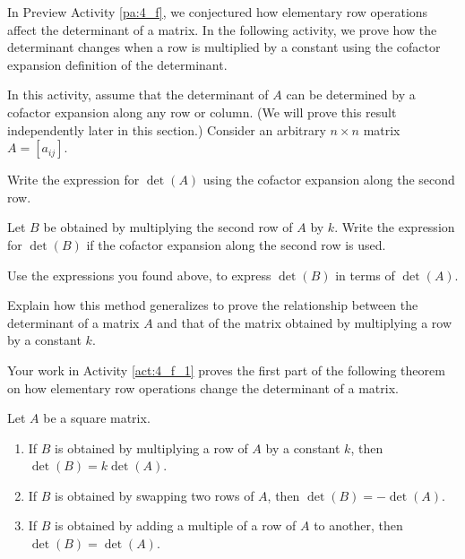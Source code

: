 
In Preview Activity \ref{pa:4_f}, we conjectured how elementary row operations affect the determinant of a matrix. In the following activity, we prove how the determinant changes when a row is multiplied by a constant using the cofactor expansion definition of the determinant.


\begin{activity} \label{act:4_f_1} In this activity, assume that the determinant of $A$ can be determined by a cofactor expansion along any row or column. (We will prove this result independently later in this section.) Consider an arbitrary $n \times n$ matrix $A = [a_{ij}]$. 
	\ba
	\item  

		\item Write the expression for $\det(A)$ using the cofactor expansion along the second row.


	
		\item Let $B$ be obtained by multiplying the second row of $A$ by $k$. Write the expression for $\det(B)$ if the cofactor expansion along the second row is used.



		\item Use the expressions you found above, to express $\det(B)$ in terms of $\det(A)$.

 

		\item Explain how this method generalizes to prove the relationship between the determinant of a matrix $A$ and that of the matrix obtained by multiplying a row by a constant $k$.
	

	
	\ea

\end{activity}



Your work in Activity \ref{act:4_f_1} proves the first part of the following theorem on how elementary row operations change the determinant of a matrix. 

\begin{theorem} \label{thm:4_f_1} Let $A$ be a square matrix. 
\begin{enumerate}
\item If $B$ is obtained by multiplying a row of $A$ by a constant $k$, then $\det(B)=k\det(A)$.
\item If $B$ is obtained by swapping two rows of $A$, then $\det(B)=-\det(A)$.
\item If $B$ is obtained by adding a multiple of a row of $A$ to another, then $\det(B)=\det(A)$.
\end{enumerate}
\end{theorem}

